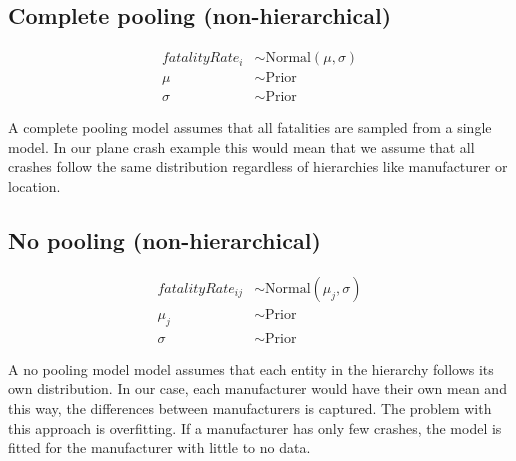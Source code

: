 \documentclass[12pt,a4paper]{article}
\begin{document}


\subsection{Complete pooling (non-hierarchical)}

\begin{align*}
  fatalityRate_i & \sim \text{Normal}(\mu, \sigma) \\
  \mu            & \sim \text{Prior}               \\
  \sigma         & \sim \text{Prior}
\end{align*}

A complete pooling model assumes that all fatalities are sampled from a single model. In our plane crash example this would mean that we assume that all crashes follow the same distribution regardless of hierarchies like manufacturer or location.\\

\subsection{No pooling (non-hierarchical)}
\begin{align*}
  fatalityRate_{ij} & \sim \text{Normal}(\mu_j, \sigma) \\
  \mu_j             & \sim \text{Prior}                 \\
  \sigma            & \sim \text{Prior}
\end{align*}

A no pooling model model assumes that each entity in the hierarchy follows its own distribution. In our case, each manufacturer would have their own mean and this way, the differences between manufacturers is captured. The problem with this approach is overfitting. If a manufacturer has only few crashes, the model is fitted for the manufacturer with little to no data.
\end{document}
